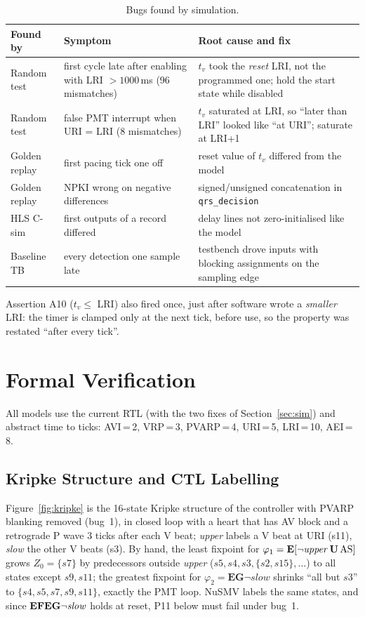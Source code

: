 \documentclass[11pt,a4paper]{article}
\newcommand{\EG}{\mathbf{EG}}\newcommand{\AX}{\mathbf{AX}}\newcommand{\EX}{\mathbf{EX}}
\begin{document}
\begin{table}[!tbp]\centering\footnotesize
\caption{Bugs found by simulation.}\label{tab:bugs}
\begin{tabularx}{\linewidth}{@{}lXX@{}}
\toprule
Found by & Symptom & Root cause and fix\\
\midrule
Random test & first cycle late after enabling with LRI $>1000$\,ms (96 mismatches) &
$t_v$ took the \emph{reset} LRI, not the programmed one; hold the start state while disabled\\
Random test & false PMT interrupt when URI = LRI (8 mismatches) & $t_v$ saturated at LRI, so
``later than LRI'' looked like ``at URI''; saturate at LRI+1\\
Golden replay & first pacing tick one off & reset value of $t_v$ differed from the model\\
Golden replay & NPKI wrong on negative differences & signed/unsigned concatenation in \texttt{qrs\_decision}\\
HLS C-sim & first outputs of a record differed & delay lines not zero-initialised like the model\\
Baseline TB & every detection one sample late & testbench drove inputs with blocking assignments on the sampling edge\\
\bottomrule
\end{tabularx}
\end{table}

Assertion A10 ($t_v\le$ LRI) also fired once, just after software wrote a \emph{smaller} LRI: the
timer is clamped only at the next tick, before use, so the property was restated ``after every tick''.

\section{Formal Verification}
\label{sec:formal}
All models use the current RTL (with the two fixes of Section~\ref{sec:sim}) and abstract time to
ticks: AVI\,=\,2, VRP\,=\,3, PVARP\,=\,4, URI\,=\,5, LRI\,=\,10, AEI\,=\,8.

\subsection{Kripke Structure and CTL Labelling}
Figure~\ref{fig:kripke} is the 16-state Kripke structure of the controller with PVARP blanking
removed (bug~1), in closed loop with a heart that has AV block and a retrograde P wave 3 ticks after
each V beat; \textit{upper} labels a V beat at URI (s11), \textit{slow} the other V beats (s3). By
hand, the least fixpoint for $\varphi_1=\mathbf{E}[\neg\mathit{upper}\,\mathbf{U}\,\mathrm{AS}]$ grows
$Z_0=\{s7\}$ by predecessors outside \textit{upper} ($s5, s4, s3, \{s2,s15\},\ldots$) to all states
except $s9, s11$; the greatest fixpoint for $\varphi_2=\EG\neg\mathit{slow}$ shrinks ``all but $s3$''
to $\{s4,s5,s7,s9,s11\}$, exactly the PMT loop. NuSMV labels the same states, and since
$\EF\EG\neg\mathit{slow}$ holds at reset, P11 below must fail under bug~1.
\end{document}
